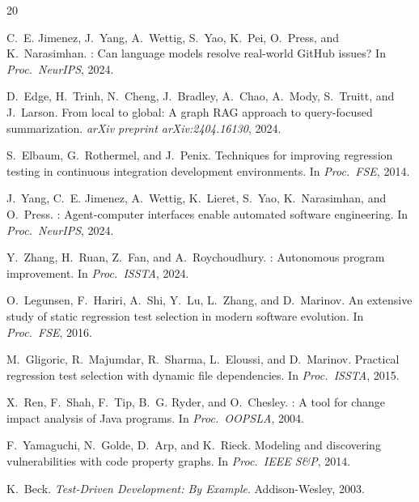 \documentclass[sigconf,nonacm]{acmart}
\begin{document}
{\small
\begin{thebibliography}{20}
\setlength{\itemsep}{2pt plus 1pt minus 1pt}
\setlength{\parsep}{0pt}

C.~E. Jimenez, J.~Yang, A.~Wettig, S.~Yao, K.~Pei, O.~Press, and
K.~Narasimhan.
: Can language models resolve real-world {GitHub} issues?
\newblock In \emph{Proc.\ NeurIPS}, 2024.

D.~Edge, H.~Trinh, N.~Cheng, J.~Bradley, A.~Chao, A.~Mody, S.~Truitt, and
J.~Larson.
\newblock From local to global: A graph {RAG} approach to query-focused
summarization.
\newblock \emph{arXiv preprint arXiv:2404.16130}, 2024.

S.~Elbaum, G.~Rothermel, and J.~Penix.
\newblock Techniques for improving regression testing in continuous integration
development environments.
\newblock In \emph{Proc.\ FSE}, 2014.

J.~Yang, C.~E. Jimenez, A.~Wettig, K.~Lieret, S.~Yao, K.~Narasimhan, and
O.~Press.
: Agent-computer interfaces enable automated software
engineering.
\newblock In \emph{Proc.\ NeurIPS}, 2024.

Y.~Zhang, H.~Ruan, Z.~Fan, and A.~Roychoudhury.
: Autonomous program improvement.
\newblock In \emph{Proc.\ ISSTA}, 2024.

O.~Legunsen, F.~Hariri, A.~Shi, Y.~Lu, L.~Zhang, and D.~Marinov.
\newblock An extensive study of static regression test selection in modern
software evolution.
\newblock In \emph{Proc.\ FSE}, 2016.

M.~Gligoric, R.~Majumdar, R.~Sharma, L.~Eloussi, and D.~Marinov.
\newblock Practical regression test selection with dynamic file dependencies.
\newblock In \emph{Proc.\ ISSTA}, 2015.

X.~Ren, F.~Shah, F.~Tip, B.~G. Ryder, and O.~Chesley.
: A tool for change impact analysis of {Java} programs.
\newblock In \emph{Proc.\ OOPSLA}, 2004.

F.~Yamaguchi, N.~Golde, D.~Arp, and K.~Rieck.
\newblock Modeling and discovering vulnerabilities with code property graphs.
\newblock In \emph{Proc.\ IEEE S\&P}, 2014.

K.~Beck.
\newblock \emph{Test-Driven Development: By Example}.
\newblock Addison-Wesley, 2003.


\end{thebibliography}}
\end{document}
